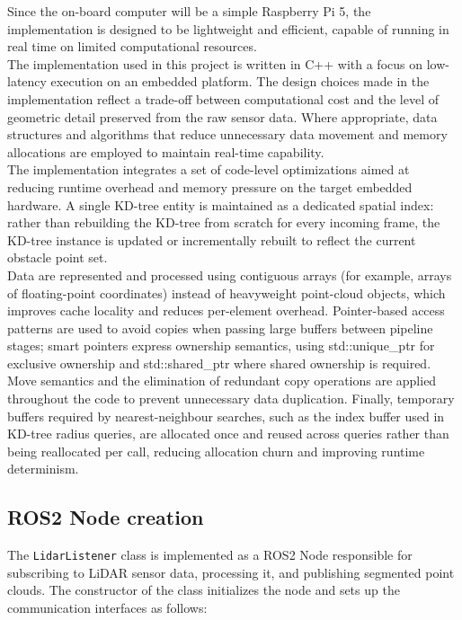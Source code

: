 Since the on-board computer will be a simple Raspberry Pi 5, the implementation is designed to be lightweight and efficient, capable of running in real time on limited computational resources.
\\
The implementation used in this project is written in C++ with a focus on low-latency execution on an embedded platform. 
The design choices made in the implementation reflect a trade-off between computational cost and the level of geometric detail preserved from the raw sensor data. 
Where appropriate, data structures and algorithms that reduce unnecessary data movement and memory allocations are employed to maintain real-time capability. \\

The implementation integrates a set of code-level optimizations aimed at reducing runtime overhead and memory pressure on the target embedded hardware. 
A single KD-tree entity is maintained as a dedicated spatial index: rather than rebuilding the KD-tree from scratch for every incoming frame, the KD-tree instance is updated 
or incrementally rebuilt to reflect the current obstacle point set. \\
Data are represented and processed using contiguous arrays (for example, arrays of floating-point coordinates) instead of heavyweight point-cloud objects, 
which improves cache locality and reduces per-element overhead. Pointer-based access patterns are used to avoid copies when passing large buffers between pipeline stages; 
smart pointers express ownership semantics, using std::unique\_ptr for exclusive ownership and std::shared\_ptr where shared ownership is required. \\ 
Move semantics and the elimination of redundant copy operations are applied throughout the code to prevent unnecessary data duplication. Finally, temporary buffers required by nearest-neighbour searches, 
such as the index buffer used in KD-tree radius queries, are allocated once and reused across queries rather than being reallocated per call, reducing allocation churn and improving runtime determinism.

\subsection{ROS2 Node creation}

The \texttt{LidarListener} class is implemented as a ROS2 Node responsible for subscribing to LiDAR sensor data, processing it, 
and publishing segmented point clouds. The constructor of the class initializes the node and sets up the communication interfaces as follows:


